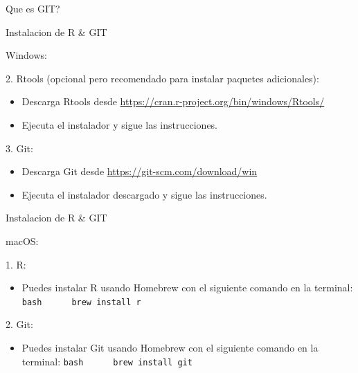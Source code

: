 \documentclass[
  ignorenonframetext,
]{beamer}
\providecommand{\tightlist}{%
  \setlength{\itemsep}{0pt}\setlength{\parskip}{0pt}}
\begin{document}
\begin{frame}[fragile]{Que es GIT?}
\begin{block}{Instalacion de R \& GIT}
\begin{block}{Windows:}
\begin{block}{2. Rtools (opcional pero recomendado para instalar
paquetes adicionales):}
\protect\hypertarget{rtools-opcional-pero-recomendado-para-instalar-paquetes-adicionales}{}
\begin{itemize}
\tightlist
\item
  Descarga Rtools desde
  \url{https://cran.r-project.org/bin/windows/Rtools/}
\item
  Ejecuta el instalador y sigue las instrucciones.
\end{itemize}
\end{block}

\begin{block}{3. Git:}
\protect\hypertarget{git}{}
\begin{itemize}
\tightlist
\item
  Descarga Git desde \url{https://git-scm.com/download/win}
\item
  Ejecuta el instalador descargado y sigue las instrucciones.
\end{itemize}
\end{block}
\end{block}
\end{block}

\begin{block}{Instalacion de R \& GIT}
\protect\hypertarget{instalacion-de-r-git-1}{}
\begin{block}{macOS:}
\protect\hypertarget{macos}{}
\begin{block}{1. R:}
\protect\hypertarget{r-1}{}
\begin{itemize}
\tightlist
\item
  Puedes instalar R usando Homebrew con el siguiente comando en la
  terminal: \texttt{bash\ \ \ \ \ \ brew\ install\ r}
\end{itemize}
\end{block}

\begin{block}{2. Git:}
\protect\hypertarget{git-1}{}
\begin{itemize}
\tightlist
\item
  Puedes instalar Git usando Homebrew con el siguiente comando en la
  terminal: \texttt{bash\ \ \ \ \ \ brew\ install\ git}
\end{itemize}
\end{block}
\end{block}
\end{block}


\end{frame}
\end{document}

